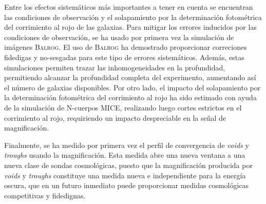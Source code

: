 Entre los efectos sistem\'aticos m\'as importantes a tener en cuenta se encuentran las condiciones de observaci\'on y el solapamiento por la determinaci\'on fotom\'etrica del corrimiento al rojo de las galaxias. Para mitigar los errores inducidos por las condiciones de observaci\'on, se ha usado por primera vez la simulaci\'on de im\'agenes {\scshape Balrog}. El uso de {\scshape Balrog} ha demostrado proporcionar correciones fidedigas y no-sesgadas para este tipo de errores sistem\'aticos. Adem\'as, estas simulaciones permiten trazar las inhomogeneidades en la profundidad, permitiendo alcanzar la profundidad completa del experimento, aumentando as\'i el n\'umero de galaxias disponibles. Por otro lado, el impacto del solapamiento por la determinaci\'on fotom\'etrica del corrimiento al rojo ha sido estimado con ayuda de la simulaci\'on de N-cuerpos MICE, realizando luego cortes estrictos en el corrimiento al rojo, requiriendo un impacto despreciable en la se\~nal de magnificaci\'on.
\newline

Finalmente, se ha medido por primera vez el perfil de convergencia de {\it voids} y {\it troughs} usando la magnificaci\'on. Esta medida abre una nueva ventana a una nueva clase de sondas cosmol\'ogicas, puesto que la magnificaci\'on producida por {\it voids} y {\it troughs} constituye una medida nueva e independiente para la energ\'ia oscura, que en un futuro inmediato puede proporcionar medidas cosmol\'ogicas competitivas y fidedignas.